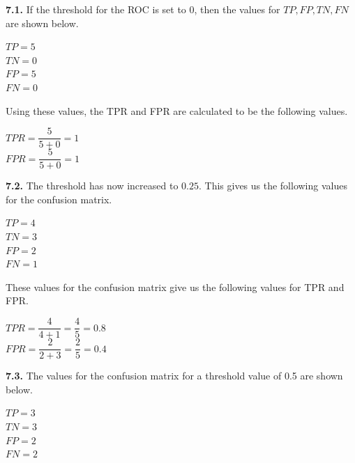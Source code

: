 \documentclass[12pt]{article}
\begin{document}
{\bf 7.1.} If the threshold for the ROC is set to 0, then the values for $TP, FP, TN, FN$ are shown below.

\begin{center}

$TP=5$\\
$TN=0$\\
$FP=5$\\
$FN=0$\\

\end{center}

Using these values, the TPR and FPR are calculated to be the following values.

\begin{center}

$TPR=\dfrac{5}{5+0}=1$\\
\bigskip
$FPR=\dfrac{5}{5+0}=1$\\

\end{center}

{\bf 7.2.} The threshold has now increased to $0.25$. This gives us the following values for the confusion matrix.

\begin{center}

$TP=4$\\
$TN=3$\\
$FP=2$\\
$FN=1$\\

\end{center}

These values for the confusion matrix give us the following values for TPR and FPR.

\begin{center}

$TPR=\dfrac{4}{4+1}=\dfrac{4}{5}=0.8$\\
\bigskip
$FPR=\dfrac{2}{2+3}=\dfrac{2}{5}=0.4$\\

\end{center}

{\bf 7.3.} The values for the confusion matrix for a threshold value of 0.5 are shown below.

\begin{center}

$TP=3$\\
$TN=3$\\
$FP=2$\\
$FN=2$\\

\end{center}
\end{document}
